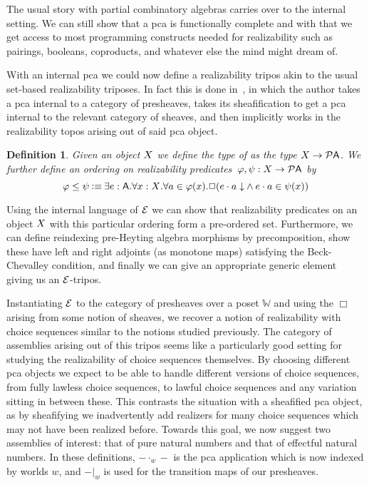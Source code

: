 \documentclass{easychair}
\newtheorem{defn}[thrm]{Definition}
\begin{document}
The usual story with partial combinatory algebras carries over to the
internal setting.
%
We can still show that a pca is functionally complete and with that we get
access to most programming constructs needed for realizability such as pairings,
booleans, coproducts, and whatever else the mind might dream of.

With an internal pca we could now define a realizability tripos akin to the
usual set-based realizability triposes.
%
In fact this is done in~\cite{vanoostenSemanticalProofJonghs1991}, in which the
author takes a pca internal to a category of presheaves, takes its
sheafification to get a pca internal to the relevant category of sheaves, and
then implicitly works in the realizability topos arising out of said pca object.
%


\begin{defn}
  Given an object \(X\) we define the type of  as the type \({{X}\to{\mathcal{P}{\ensuremath{\mathsf{A}}}}}\).
  We further define an ordering on realizability
  predicates~\(\varphi, \psi : {{X}\to{\mathcal{P}{\ensuremath{\mathsf{A}}}}}\) by
  \[
    \varphi \leq \psi
    \IsDefined
    \IExists{e : \A}{
      \IForall{x : \X}{
        \IForall{a \in \varphi(x)}{
          \IBox{(
            \IAnd%
            {\ITotal{\IAp{e}{a}}}%
            {\IAp{e}{a} \in \psi(x)}
          )}
        }
      }
    }
  \]
\end{defn}

Using the internal language of \(\mathcal{E}\) we can show that realizability predicates
on an object \(X\) with this particular ordering form a pre-ordered set.
%
Furthermore, we can define reindexing pre-Heyting algebra morphisms by
precomposition, show these have left and right adjoints (as monotone maps)
satisfying the Beck-Chevalley condition, and finally we can give an appropriate
generic element giving us an \(\mathcal{E}\)-tripos.

Instantiating \(\mathcal{E}\) to the category of presheaves over a poset \(\mathbb{W}\)
and using the \(\Box\) arising from some notion of sheaves, we recover a notion
of realizability with choice sequences similar to the notions studied
previously.
%
The category of assemblies arising out of this tripos seems like a particularly
good setting for studying the realizability of choice sequences themselves.
%
By choosing different pca objects we expect to be able to handle different
versions of choice sequences, from fully lawless choice sequences, to lawful
choice sequences and any variation sitting in between these.
%
This contrasts the situation with a sheafified pca object, as by sheafifying
we inadvertently add realizers for many choice sequences which may not
have been realized before.
%
Towards this goal, we now suggest two assemblies of interest: that of
pure natural numbers and that of effectful natural numbers.
%
In these definitions, \(-\cdot_{w}-\) is the pca application which is now
indexed by worlds \(w\), and \(-|_{w}\) is used for the transition maps
of our presheaves.
\end{document}
